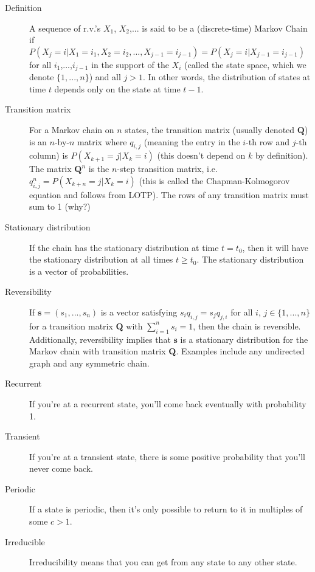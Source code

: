 \documentclass{article}
\begin{document}
\begin{description}

\item[Definition] A sequence of r.v.'s $X_1$, $X_2$,... is said to be a (discrete-time) Markov Chain if $P(X_j = i|X_1=i_1,X_2=i_2,...,X_{j-1}=i_{j-1}) = P(X_j=i|X_{j-1}=i_{j-1})$ for all $i_1$,...,$i_{j-1}$ in the support of the $X_i$ (called the state space, which we denote $\{1,...,n\}$) and all $j > 1$. In other words, the distribution of states at time $t$ depends only on the state at time $t-1$. 

\item[Transition matrix] For a Markov chain on $n$ states, the transition matrix (usually denoted $\mathbf{Q}$) is an $n$-by-$n$ matrix where $q_{i,j}$ (meaning the entry in the $i$-th row and $j$-th column) is $P(X_{k+1}=j|X_k=i)$ (this doesn't depend on $k$ by definition). The matrix $\mathbf{Q}^n$ is the $n$-step transition matrix, i.e. $q^n_{i,j} = P(X_{k+n}=j|X_k=i)$ (this is called the Chapman-Kolmogorov equation and follows from LOTP). The rows of any transition matrix must sum to 1 (why?)

\item[Stationary distribution] If the chain has the stationary distribution at time $t = t_0$, then it will have the stationary distribution at all times $t \geq t_0$. The stationary distribution is a vector of probabilities.

\item[Reversibility] If $\mathbf{s} = (s_1,...,s_n)$ is a vector satisfying $s_iq_{i,j} = s_jq_{j,i}$ for all $i$, $j \in \{1,...,n\}$ for a transition matrix $\mathbf{Q}$ with $\sum_{i=1}^n s_i = 1$, then the chain is reversible. Additionally, reversibility implies that $\mathbf{s}$ is a stationary distribution for the Markov chain with transition matrix $\mathbf{Q}$. Examples include any undirected graph and any symmetric chain. 

\item[Recurrent] If you're at a recurrent state, you'll come back eventually with probability 1.

\item[Transient] If you're at a transient state, there is some positive probability that you'll never come back.

\item[Periodic] If a state is periodic, then it's only possible to return to it in multiples of some $c > 1$.

\item[Irreducible] Irreducibility means that you can get from any state to any other state.

\end{description}
\end{document}
